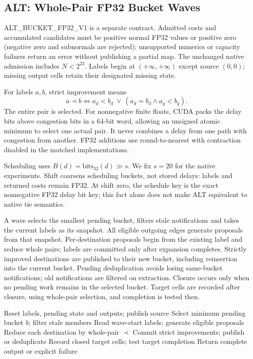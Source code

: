 \documentclass[conference,10pt,letterpaper]{IEEEtran}
\begin{document}
\subsection{ALT: Whole-Pair FP32 Bucket Waves}
ALT\_BUCKET\_FP32\_V1 is a separate contract. Admitted costs and accumulated candidates must be positive normal FP32 values or positive zero (negative zero and subnormals are rejected); unsupported numerics or capacity failures return an error without publishing a partial map. The unchanged native admission includes $N<2^{23}$. Labels begin at $(+\infty,+\infty)$ except source $(0,0)$; missing output cells retain their designated missing state.

For labels $a,b$, strict improvement means
\begin{equation}
a\prec b\iff a_d<b_d\ \lor\ (a_d=b_d\land a_q<b_q).
\end{equation}
The entire pair is selected. For nonnegative finite floats, CUDA packs the delay bits above congestion bits in a 64-bit word, allowing an unsigned atomic minimum to select one actual pair. It never combines a delay from one path with congestion from another. FP32 additions use round-to-nearest with contraction disabled in the matched implementations.

Scheduling uses $B(d)=\mathrm{bits}_{32}(d)\gg s$. We fix $s=20$ for the native experiments. Shift coarsens scheduling buckets, not stored delays: labels and returned costs remain FP32. At shift zero, the schedule key is the exact nonnegative FP32 delay bit key; this fact alone does not make ALT equivalent to native tie semantics.

A wave selects the smallest pending bucket, filters stale notifications and takes the current labels as its snapshot. All eligible outgoing edges generate proposals from that snapshot. Per-destination proposals begin from the existing label and reduce whole pairs; labels are committed only after expansion completes. Strictly improved destinations are published to their new bucket, including reinsertion into the current bucket. Pending deduplication avoids losing same-bucket notifications; old notifications are filtered on extraction. Closure occurs only when no pending work remains in the selected bucket. Target cells are recorded after closure, using whole-pair selection, and completion is tested then.

\begin{algorithm}[t]\caption{ALT wave contract (one logical sample)}\label{alg:alt}
\begin{algorithmic}[1]
\State Reset labels, pending state and outputs; publish source
\State Select minimum pending bucket $b$; filter stale members
\State Read wave-start labels; generate eligible proposals
\State Reduce each destination by whole-pair $\prec$
\State Commit strict improvements; publish or deduplicate
\State Record closed target cells; test target completion
\EndIf
\EndWhile
\State Return complete output or explicit failure
\end{algorithmic}\end{algorithm}
\end{document}
